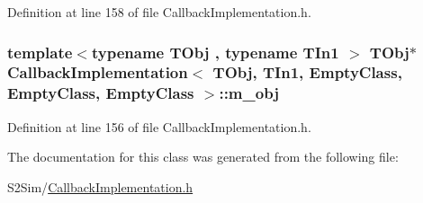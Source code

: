 Definition at line 158 of file Callback\-Implementation.\-h.

\hypertarget{class_callback_implementation_3_01_t_obj_00_01_t_in1_00_01_empty_class_00_01_empty_class_00_01_empty_class_01_4_a830dcb1573886b5ea7503fd923553059}{
\subsubsection[{m\-\_\-obj}]{\setlength{\rightskip}{0pt plus 5cm}template$<$typename T\-Obj , typename T\-In1 $>$ T\-Obj$\ast$ {\bf Callback\-Implementation}$<$ T\-Obj, T\-In1, {\bf Empty\-Class}, {\bf Empty\-Class}, {\bf Empty\-Class} $>$\-::m\-\_\-obj\hspace{0.3cm}{\ttfamily [private]}}}\label{class_callback_implementation_3_01_t_obj_00_01_t_in1_00_01_empty_class_00_01_empty_class_00_01_empty_class_01_4_a830dcb1573886b5ea7503fd923553059}


Definition at line 156 of file Callback\-Implementation.\-h.



The documentation for this class was generated from the following file\-:\begin{DoxyCompactItemize}
\item 
S2\-Sim/\hyperlink{_callback_implementation_8h}{Callback\-Implementation.\-h}\end{DoxyCompactItemize}
